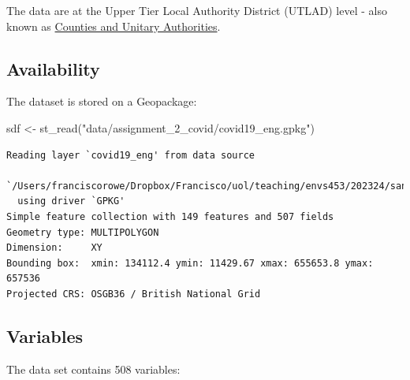 \documentclass[
  letterpaper,
  DIV=11,
  numbers=noendperiod,
  oneside]{scrreprt}
\newenvironment{Shaded}{\begin{snugshade}}{\end{snugshade}}
\newcommand{\FunctionTok}[1]{\textcolor[rgb]{0.28,0.35,0.67}{#1}}
\newcommand{\NormalTok}[1]{\textcolor[rgb]{0.00,0.23,0.31}{#1}}
\newcommand{\OtherTok}[1]{\textcolor[rgb]{0.00,0.23,0.31}{#1}}
\newcommand{\StringTok}[1]{\textcolor[rgb]{0.13,0.47,0.30}{#1}}
\begin{document}
The data are at the Upper Tier Local Authority District (UTLAD) level -
also known as \href{https://geoportal.statistics.gov.uk}{Counties and
Unitary Authorities}.

\subsection*{Availability}\label{availability-1}

The dataset is stored on a Geopackage:

\begin{Shaded}
\begin{Highlighting}[]
\NormalTok{sdf }\OtherTok{\textless{}{-}} \FunctionTok{st\_read}\NormalTok{(}\StringTok{"data/assignment\_2\_covid/covid19\_eng.gpkg"}\NormalTok{)}
\end{Highlighting}
\end{Shaded}

\begin{verbatim}
Reading layer `covid19_eng' from data source 
  `/Users/franciscorowe/Dropbox/Francisco/uol/teaching/envs453/202324/san/data/assignment_2_covid/covid19_eng.gpkg' 
  using driver `GPKG'
Simple feature collection with 149 features and 507 fields
Geometry type: MULTIPOLYGON
Dimension:     XY
Bounding box:  xmin: 134112.4 ymin: 11429.67 xmax: 655653.8 ymax: 657536
Projected CRS: OSGB36 / British National Grid
\end{verbatim}

\subsection*{Variables}\label{variables-1}

The data set contains 508 variables:
\end{document}
